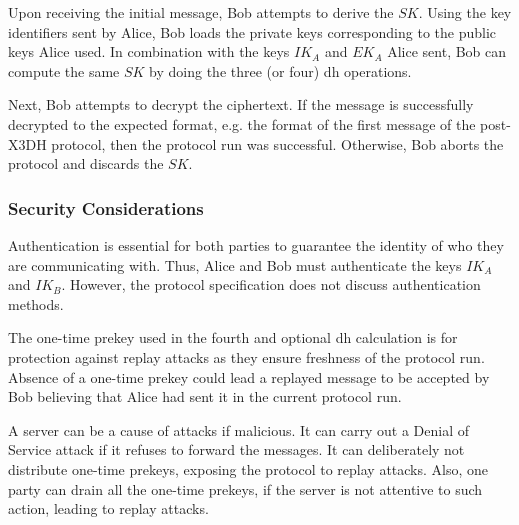 Upon receiving the initial message, Bob attempts to derive the $ SK $.
Using the key identifiers sent by Alice, Bob loads the private keys corresponding to the public keys Alice used. In combination with the keys $ IK_{A} $ and $ EK_{A} $ Alice sent, Bob can compute the same $ SK $ by doing the three (or four) \gls{dh} operations.
\par
Next, Bob attempts to decrypt the ciphertext. If the message is successfully decrypted to the expected format, e.g. the format of the first message of the post-X3DH protocol, then the protocol run was successful. Otherwise, Bob aborts the protocol and discards the $ SK $.

\subsubsection{Security Considerations}
Authentication is essential for both parties to guarantee the identity of who they are communicating with. Thus, Alice and Bob must authenticate the keys $ IK_{A} $ and $ IK_{B} $. However, the protocol specification does not discuss authentication methods.
\par
The one-time prekey used in the fourth and optional \gls{dh} calculation is for protection against replay attacks as they ensure freshness of the protocol run. Absence of a one-time prekey could lead a replayed message to be accepted by Bob believing that Alice had sent it in the current protocol run.
\par
A server can be a cause of attacks if malicious. It can carry out a Denial of Service attack if it refuses to forward the messages. It can deliberately not distribute one-time prekeys, exposing the protocol to replay attacks. Also, one party can drain all the one-time prekeys, if the server is not attentive to such action, leading to replay attacks.


